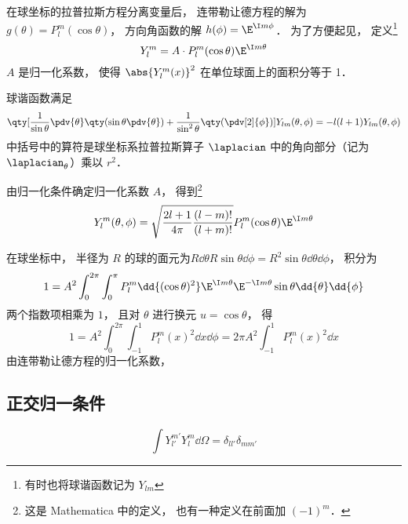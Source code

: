 

在球坐标的拉普拉斯方程分离变量后， 连带勒让德方程的解为 $g(\theta) = P_l^m(\cos\theta)$， 方向角函数的解 $h(\phi) = \E^{\I m\phi}$． 为了方便起见， 定义\footnote{有时也将球谐函数记为 $Y_{lm}$}
\begin{equation}
Y_l^m = A \cdot P_l^m(\cos \theta) \E^{\I m\theta}
\end{equation}
$A$ 是归一化系数， 使得 $\abs{Y_l^m (x)}^2$ 在单位球面上的面积分等于 1．

球谐函数满足
\begin{equation}
\qty[\frac{1}{\sin\theta}\pdv{\theta} \qty(\sin \theta \pdv{\theta}) + \frac{1}{\sin^2 \theta} \qty(\pdv[2]{\phi})]Y_{lm}(\theta, \phi) = -l(l+1)Y_{lm}(\theta, \phi)
\end{equation}
中括号中的算符是球坐标系拉普拉斯算子 $\laplacian$ 中的角向部分（记为 $\laplacian_\theta$）乘以 $r^2$．

由归一化条件确定归一化系数 $A$， 得到\footnote{这是 Mathematica 中的定义， 也有一种定义在前面加 $(-1)^m$．}
\begin{equation}
Y_l^m (\theta ,\phi) = \sqrt{\frac{2l + 1}{4\pi }\frac{(l - m)!}{(l + m)!}} P_l^m (\cos\theta) \E^{\I m\theta}
\end{equation}

在球坐标中， 半径为 $R$ 的球的面元为$R \dd{\theta} R\sin\theta \dd{\phi} = R^2 \sin\theta \dd{\theta} \dd{\phi}$，  积分为
\begin{equation}
1 = A^2\int_0^{2\pi } \int_0^\pi  P_l^m \dd{(\cos \theta)^2} \E^{\I m\theta} \E^{-\I m\theta}\sin\theta \dd{\theta} \dd{\phi}
\end{equation}
两个指数项相乘为 $1$，  且对 $\theta$ 进行换元 $u = \cos\theta $， 得
\begin{equation}
1 = A^2 \int_0^{2\pi} \int_{-1}^1 P_l^m {{(x)}^2} \dd{x} \dd{\phi} = 2\pi A^2 \int_{-1}^1 P_l^m (x)^2 \dd{x} 
\end{equation}
由连带勒让德方程的归一化系数， %


\subsection{正交归一条件}
\begin{equation}
\int Y_{l'}^{m'} Y_l^m \dd{\Omega} = \delta_{ll'}\delta_{mm'}
\end{equation}

